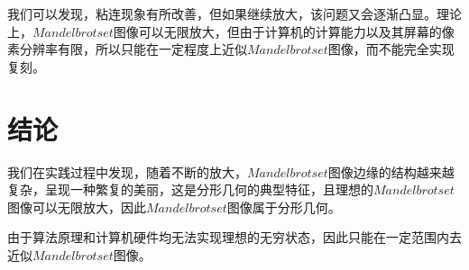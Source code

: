 \documentclass{ctexart}
\begin{document}
我们可以发现，粘连现象有所改善，但如果继续放大，该问题又会逐渐凸显。理论上，$Mandelbrot set$图像可以无限放大，但由于计算机的计算能力以及其屏幕的像素分辨率有限，所以只能在一定程度上近似$Mandelbrot set$图像，而不能完全实现复刻。

\section{结论}

我们在实践过程中发现，随着不断的放大，$Mandelbrot set$图像边缘的结构越来越复杂，呈现一种繁复的美丽，这是分形几何的典型特征，且理想的$Mandelbrot set$图像可以无限放大，因此$Mandelbrot set$图像属于分形几何。\par
由于算法原理和计算机硬件均无法实现理想的无穷状态，因此只能在一定范围内去近似$Mandelbrot set$图像。

\newcommand{\url}{}


\end{document}
